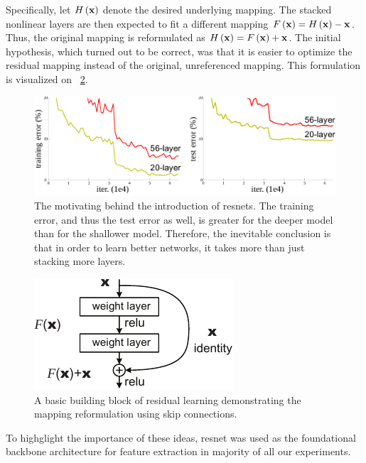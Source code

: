 Specifically, let ${H} \left( \mathbf{x} \right)$ denote the desired underlying mapping. The stacked nonlinear layers are then expected to fit a different mapping ${F} \left( \mathbf{x} \right) = {H} \left( \mathbf{x} \right) - \mathbf{x}$. Thus, the original mapping is reformulated as ${H} \left( \mathbf{x} \right) = {F} \left( \mathbf{x} \right) + \mathbf{x}$. The initial hypothesis, which turned out to be correct, was that it is easier to optimize the residual mapping instead of the original, unreferenced mapping. This formulation is visualized on \figstr{}~\ref{fig:SkipConnections}.

\begin{figure}[t]
  \centerline{\includegraphics[width=0.9\linewidth]{figures/theoretical_foundations/resnet_motivation.pdf}}
  \caption[\Gls{resnet} motivation]{The motivating behind the introduction of \glspl{resnet}. The training error, and thus the test error as well, is greater for the deeper model than for the shallower model. Therefore, the inevitable conclusion is that in order to learn better networks, it takes more than just stacking more layers. }
  \label{fig:ResnetMotivation}
\end{figure}

\begin{figure}[t]
  \centerline{\includegraphics[width=0.35\linewidth]{figures/theoretical_foundations/skip_connections.pdf}}
  \caption[Skip connections]{A basic building block of residual learning demonstrating the mapping reformulation using skip connections. }
  \label{fig:SkipConnections}
\end{figure}

To highglight the importance of these ideas, \Gls{resnet} was used as the foundational backbone architecture for feature extraction in majority of all our experiments.

